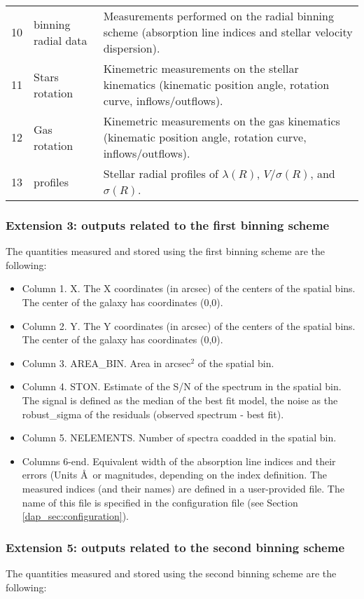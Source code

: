 \begin{center}
\begin{longtable}{p{0.5cm}|p{3.5cm}| p{10.1cm}}
10 & binning radial data & Measurements performed on the radial binning scheme (absorption line indices and stellar velocity dispersion).  \\ 
11 & Stars rotation & Kinemetric measurements on the stellar kinematics (kinematic position angle, rotation curve, inflows/outflows).  \\ 
12 & Gas rotation   & Kinemetric measurements on the gas kinematics (kinematic position angle, rotation curve, inflows/outflows).  \\ 
13 & profiles       & Stellar radial profiles of $\lambda(R)$, $V/\sigma(R)$, and $\sigma(R)$.\\
\hline
\end{longtable}
\end{center}

\subsubsection{Extension 3: outputs related to the first binning
  scheme} 
\label{}
The quantities measured and stored using the first binning scheme are
the following:

\begin{itemize}

\item Column 1. X. The X coordinates (in arcsec) of the centers of the spatial bins. The center of the galaxy has coordinates (0,0).
\item Column 2. Y. The Y coordinates (in arcsec) of the centers of the spatial bins. The center of the galaxy has coordinates (0,0).
\item Column 3. AREA\_BIN. Area in arcsec$^2$ of the spatial bin.
\item Column 4. STON. Estimate of the S/N of the spectrum in the
  spatial bin. The signal is defined as the median of the best fit
  model, the noise as the robust\_sigma of the residuals (observed
  spectrum - best fit).
\item Column 5. NELEMENTS. Number of spectra coadded in the spatial bin.
\item Columns 6-end. Equivalent width of the absorption line indices
  and their errors (Units \AA\ or magnitudes, depending on the index
  definition. The measured indices (and their names) are defined in a
  user-provided file. The name of this file is specified in the
  configuration file (see Section \ref{dap_sec:configuration}).
\end{itemize}

\subsubsection{Extension 5: outputs related to the second binning
  scheme} 
\label{}
The quantities measured and stored using the second binning scheme are
the following:

